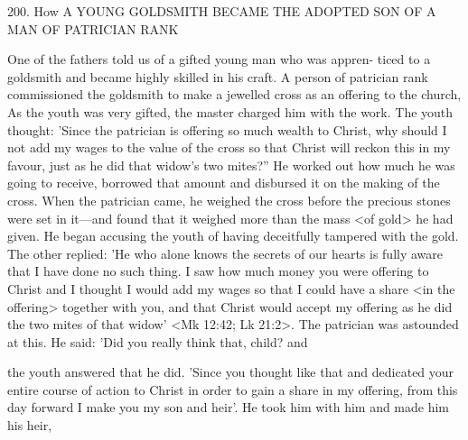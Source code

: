 200. How A YOUNG GOLDSMITH
BECAME THE ADOPTED
SON OF A MAN OF PATRICIAN RANK

One of the fathers told us of a gifted young man who was appren-
ticed to a goldsmith and became highly skilled in his craft. A person
of patrician rank commissioned the goldsmith to make a jewelled
cross as an offering to the church, As the youth was very gifted, the
master charged him with the work. The youth thought: 'Since the
patrician is offering so much wealth to Christ, why should I not add
my wages to the value of the cross so that Christ will reckon this in
my favour, just as he did that widow's two mites?” He worked out
how much he was going to receive, borrowed that amount and
disbursed it on the making of the cross. When the patrician came,
he weighed the cross before the precious stones were set in it—and
found that it weighed more than the mass <of gold> he had given.
He began accusing the youth of having deceitfully tampered with
the gold. The other replied: 'He who alone knows the secrets of our
hearts is fully aware that I have done no such thing. I saw how
much money you were offering to Christ and I thought I would add
my wages so that I could have a share <in the offering> together
with you, and that Christ would accept my offering as he did the
two mites of that widow' <Mk 12:42; Lk 21:2>. The patrician was
astounded at this. He said: 'Did you really think that, child? and

the youth answered that he did. 'Since you thought like that and
dedicated your entire course of action to Christ in order to gain a
share in my offering, from this day forward I make you my son and
heir'. He took him with him and made him his heir,

